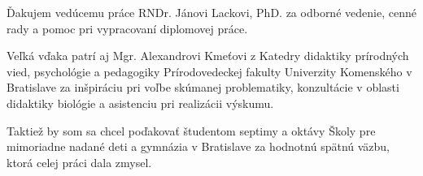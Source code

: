 Ďakujem vedúcemu práce RNDr. Jánovi Lackovi, PhD. za odborné vedenie, cenné rady a pomoc pri vypracovaní diplomovej práce. 

Veľká vďaka patrí aj Mgr. Alexandrovi Kmeťovi z Katedry didaktiky prírodných vied, psychológie a pedagogiky Prírodovedeckej fakulty Univerzity Komenského v Bratislave za inšpiráciu pri voľbe skúmanej problematiky, konzultácie v oblasti didaktiky biológie a asistenciu pri realizácii výskumu. 

Taktiež by som sa chcel poďakovať študentom septimy a oktávy Školy pre mimoriadne nadané deti a gymnázia v Bratislave za hodnotnú spätnú väzbu, ktorá celej práci dala zmysel.